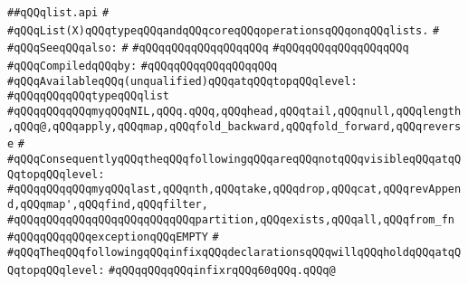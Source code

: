 \label{src/lib/std/src/list.api}
\verb|##qQQqlist.api|\newline
\verb|#|\newline
\verb|#qQQqList(X)qQQqtypeqQQqandqQQqcoreqQQqoperationsqQQqonqQQqlists.|\newline
\verb|#|\newline
\verb|#qQQqSeeqQQqalso:|\newline
\verb|#|\newline
\verb|#qQQqqQQqqQQqqQQqqQQq|\newline
\verb|#qQQqqQQqqQQqqQQqqQQq|\newline
\newline
\verb|#qQQqCompiledqQQqby:|\newline
\verb|#qQQqqQQqqQQqqQQqqQQq|\newline
\newline
\newline
\newline
\verb|#qQQqAvailableqQQq(unqualified)qQQqatqQQqtopqQQqlevel:|\newline
\verb|#qQQqqQQqqQQqtypeqQQqlist|\newline
\verb|#qQQqqQQqqQQqmyqQQqNIL,qQQq.qQQq,qQQqhead,qQQqtail,qQQqnull,qQQqlength,qQQq@,qQQqapply,qQQqmap,qQQqfold_backward,qQQqfold_forward,qQQqreverse|\newline
\verb|#|\newline
\verb|#qQQqConsequentlyqQQqtheqQQqfollowingqQQqareqQQqnotqQQqvisibleqQQqatqQQqtopqQQqlevel:|\newline
\verb|#qQQqqQQqqQQqmyqQQqlast,qQQqnth,qQQqtake,qQQqdrop,qQQqcat,qQQqrevAppend,qQQqmap',qQQqfind,qQQqfilter,|\newline
\verb|#qQQqqQQqqQQqqQQqqQQqqQQqqQQqpartition,qQQqexists,qQQqall,qQQqfrom_fn|\newline
\verb|#qQQqqQQqqQQqexceptionqQQqEMPTY|\newline
\verb|#|\newline
\verb|#qQQqTheqQQqfollowingqQQqinfixqQQqdeclarationsqQQqwillqQQqholdqQQqatqQQqtopqQQqlevel:|\newline
\verb|#qQQqqQQqqQQqinfixrqQQq60qQQq.qQQq@|\newline
\newline
\newline
\newline
